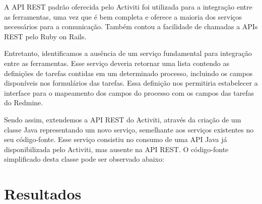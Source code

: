 A API REST padrão oferecida pelo Activiti foi utilizada para a integração entre as ferramentas, uma vez que é bem completa e oferece a maioria dos serviços necessários para a comunicação. Também contou a facilidade de chamadas a APIs REST pelo Ruby on Rails. 

Entretanto, identificamos a ausência de um serviço fundamental para integração entre as ferramentas. Esse serviço deveria retornar uma lista contendo as definições de tarefas contidas em um determinado processo, incluindo os campos disponíveis nos formulários das tarefas. Essa definição nos permitiria estabelecer a interface para o mapeamento dos campos do processo com os campos das tarefas do Redmine.

Sendo assim, extendemos a API REST do Activiti, através da criação de um classe Java representando um novo serviço, semelhante aos serviços existentes no seu código-fonte. Esse serviço consistiu no consumo de uma API Java já disponibilizada pelo Activiti, mas ausente na API REST. O código-fonte simplificado desta classe pode ser observado abaixo:


\section{Resultados}\label{sec:integracao_redmine_activiti-resultados}